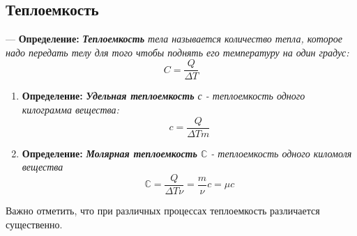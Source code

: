 \documentclass[12pt,a4paper]{report}
\begin{document}
\subsection{Теплоемкость}
--- \textbf{Определение:} \textit{\textbf{Теплоемкость} тела называется количество тепла, которое надо передать телу для того чтобы поднять его температуру на один градус: \[ C = \frac{Q}{\Delta T} \] }
\begin{enumerate}
    \item \textbf{Определение:} \textit{\textbf{Удельная теплоемкость }с - теплоемкость одного килограмма вещества: \[ c = \frac{Q}{\Delta T m}\]}
    \item \textbf{Определение:} \textit{\textbf{Молярная теплоемкость }$\mathbb{C}$ - теплоемкость одного киломоля вещества }
          \[ \mathbb{C} = \frac{Q}{\Delta T \nu} = \frac{m}{\nu}c = \mu c\]
\end{enumerate}
Важно отметить, что при различных процессах теплоемкость различается существенно.
\end{document}
